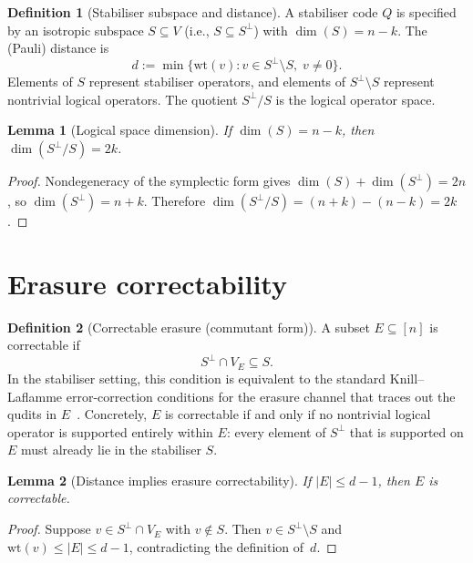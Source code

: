 \documentclass[11pt]{article}
\theoremstyle{plain}
\newtheorem{lemma}{Lemma}
\theoremstyle{definition}
\newtheorem{definition}{Definition}
\newcommand{\wt}{\mathrm{wt}}
\begin{document}
\begin{definition}[Stabiliser subspace and distance]\label{def:stabcode}
A stabiliser code $Q$ is specified by an isotropic subspace $S \subseteq V$
(i.e., $S \subseteq S^\perp$) with $\dim(S) = n - k$.  The (Pauli) distance is
\[
  d := \min\{ \wt(v) : v \in S^\perp \setminus S,\; v \neq 0 \}.
\]
Elements of $S$ represent stabiliser operators, and elements of $S^\perp \setminus S$
represent nontrivial logical operators.  The quotient $S^\perp / S$ is the logical operator
space.
\end{definition}

\begin{lemma}[Logical space dimension]\label{lem:logdim}
If $\dim(S) = n - k$, then $\dim(S^\perp / S) = 2k$.
\end{lemma}

\begin{proof}
Nondegeneracy of the symplectic form gives $\dim(S) + \dim(S^\perp) = 2n$, so
$\dim(S^\perp) = n + k$.  Therefore $\dim(S^\perp / S) = (n + k) - (n - k) = 2k$.
\end{proof}


\section{Erasure correctability}\label{sec:erasure}

\begin{definition}[Correctable erasure (commutant form)]\label{def:correctable}
A subset $E \subseteq [n]$ is correctable if
\[
  S^\perp \cap V_E \subseteq S.
\]
In the stabiliser setting, this condition is equivalent to the standard Knill--Laflamme
error-correction conditions for the erasure channel that traces out the qudits in
$E$~\cite{KnillLaflamme1997,NielsenChuang}.  Concretely, $E$ is correctable if and only if no
nontrivial logical operator is supported entirely within $E$: every element of $S^\perp$ that
is supported on $E$ must already lie in the stabiliser $S$.
\end{definition}

\begin{lemma}[Distance implies erasure correctability]\label{lem:dist-correct}
If $|E| \le d - 1$, then $E$ is correctable.
\end{lemma}

\begin{proof}
Suppose $v \in S^\perp \cap V_E$ with $v \notin S$.  Then $v \in S^\perp \setminus S$ and
$\wt(v) \le |E| \le d - 1$, contradicting the definition of~$d$.
\end{proof}
\end{document}

